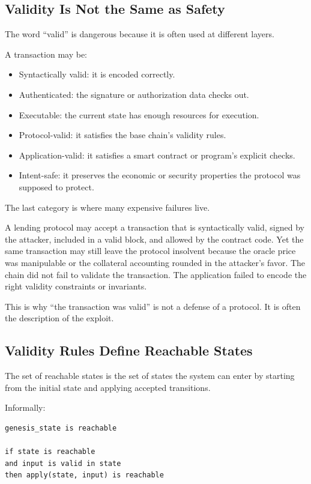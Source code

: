 \subsection{Validity Is Not the Same as Safety}

The word ``valid'' is dangerous because it is often used at different
layers.

A transaction may be:

\begin{itemize}
\tightlist
\item
  Syntactically valid: it is encoded correctly.
\item
  Authenticated: the signature or authorization data checks out.
\item
  Executable: the current state has enough resources for execution.
\item
  Protocol-valid: it satisfies the base chain's validity rules.
\item
  Application-valid: it satisfies a smart contract or program's explicit
  checks.
\item
  Intent-safe: it preserves the economic or security properties the
  protocol was supposed to protect.
\end{itemize}

The last category is where many expensive failures live.

A lending protocol may accept a transaction that is syntactically valid,
signed by the attacker, included in a valid block, and allowed by the
contract code. Yet the same transaction may still leave the protocol
insolvent because the oracle price was manipulable or the collateral
accounting rounded in the attacker's favor. The chain did not fail to
validate the transaction. The application failed to encode the right
validity constraints or invariants.

This is why ``the transaction was valid'' is not a defense of a
protocol. It is often the description of the exploit.

\subsection{Validity Rules Define Reachable States}

The set of reachable states is the set of states the system can enter by
starting from the initial state and applying accepted transitions.

Informally:

\begin{lstlisting}
genesis_state is reachable

if state is reachable
and input is valid in state
then apply(state, input) is reachable
\end{lstlisting}


